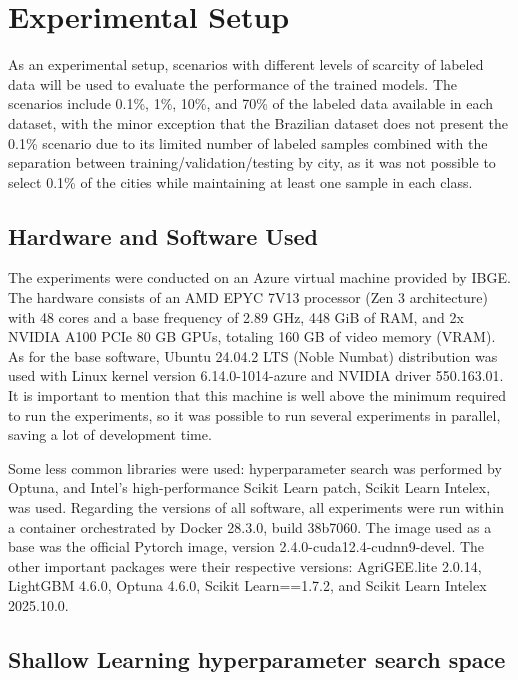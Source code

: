 \chapter{Experimental Setup}
\label{chapter:exp_setup}

As an experimental setup, scenarios with different levels of scarcity of labeled data will be used to evaluate the performance of the trained models. The scenarios include 0.1\%, 1\%, 10\%, and 70\% of the labeled data available in each dataset, with the minor exception that the Brazilian dataset does not present the 0.1\% scenario due to its limited number of labeled samples combined with the separation between training/validation/testing by city, as it was not possible to select 0.1\% of the cities while maintaining at least one sample in each class.

\section{Hardware and Software Used}

The experiments were conducted on an Azure virtual machine provided by \ac{IBGE}. The hardware consists of an AMD EPYC 7V13 processor (Zen 3 architecture) with 48 cores and a base frequency of 2.89 GHz, 448 GiB of RAM, and 2x NVIDIA A100 PCIe 80 GB GPUs, totaling 160 GB of video memory (VRAM). As for the base software, Ubuntu 24.04.2 LTS (Noble Numbat) distribution was used with Linux kernel version 6.14.0-1014-azure and NVIDIA driver 550.163.01. It is important to mention that this machine is well above the minimum required to run the experiments, so it was possible to run several experiments in parallel, saving a lot of development time.

Some less common libraries were used: hyperparameter search was performed by Optuna, and Intel's high-performance Scikit Learn patch, Scikit Learn Intelex, was used. Regarding the versions of all software, all experiments were run within a container orchestrated by Docker 28.3.0, build 38b7060. The image used as a base was the official Pytorch image, version 2.4.0-cuda12.4-cudnn9-devel. The other important packages were their respective versions: AgriGEE.lite 2.0.14, LightGBM 4.6.0, Optuna 4.6.0, Scikit Learn==1.7.2, and Scikit Learn Intelex 2025.10.0.


\section{Shallow Learning hyperparameter search space}

